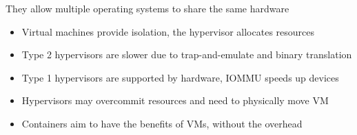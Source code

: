   \begin{slide}
    

    They allow multiple operating systems to share the same hardware

    \begin{itemize}
      \item Virtual machines provide isolation, the hypervisor allocates
            resources
      \item Type 2 hypervisors are slower due to trap-and-emulate and binary
            translation
      \item Type 1 hypervisors are supported by hardware, IOMMU speeds up devices
      \item Hypervisors may overcommit resources and need to physically move VM
      \item Containers aim to have the benefits of VMs, without the overhead
    \end{itemize}

  \end{slide}


